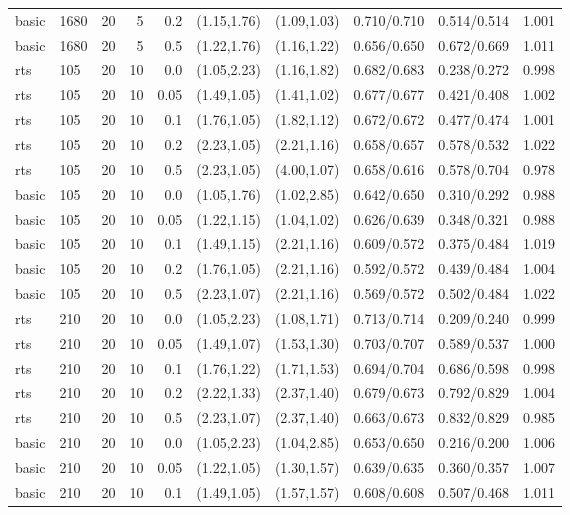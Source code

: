 \begin{tabular}{llrrrccccc}
basic & 1680 & 20 & 5 & 0.2 & (1.15,1.76) & (1.09,1.03) & 0.710/0.710 & 0.514/0.514 & 1.001 \\
basic & 1680 & 20 & 5 & 0.5 & (1.22,1.76) & (1.16,1.22) & 0.656/0.650 & 0.672/0.669 & 1.011 \\
rts & 105 & 20 & 10 & 0.0 & (1.05,2.23) & (1.16,1.82) & 0.682/0.683 & 0.238/0.272 & 0.998 \\
rts & 105 & 20 & 10 & 0.05 & (1.49,1.05) & (1.41,1.02) & 0.677/0.677 & 0.421/0.408 & 1.002 \\
rts & 105 & 20 & 10 & 0.1 & (1.76,1.05) & (1.82,1.12) & 0.672/0.672 & 0.477/0.474 & 1.001 \\
rts & 105 & 20 & 10 & 0.2 & (2.23,1.05) & (2.21,1.16) & 0.658/0.657 & 0.578/0.532 & 1.022 \\
rts & 105 & 20 & 10 & 0.5 & (2.23,1.05) & (4.00,1.07) & 0.658/0.616 & 0.578/0.704 & 0.978 \\
basic & 105 & 20 & 10 & 0.0 & (1.05,1.76) & (1.02,2.85) & 0.642/0.650 & 0.310/0.292 & 0.988 \\
basic & 105 & 20 & 10 & 0.05 & (1.22,1.15) & (1.04,1.02) & 0.626/0.639 & 0.348/0.321 & 0.988 \\
basic & 105 & 20 & 10 & 0.1 & (1.49,1.15) & (2.21,1.16) & 0.609/0.572 & 0.375/0.484 & 1.019 \\
basic & 105 & 20 & 10 & 0.2 & (1.76,1.05) & (2.21,1.16) & 0.592/0.572 & 0.439/0.484 & 1.004 \\
basic & 105 & 20 & 10 & 0.5 & (2.23,1.07) & (2.21,1.16) & 0.569/0.572 & 0.502/0.484 & 1.022 \\
rts & 210 & 20 & 10 & 0.0 & (1.05,2.23) & (1.08,1.71) & 0.713/0.714 & 0.209/0.240 & 0.999 \\
rts & 210 & 20 & 10 & 0.05 & (1.49,1.07) & (1.53,1.30) & 0.703/0.707 & 0.589/0.537 & 1.000 \\
rts & 210 & 20 & 10 & 0.1 & (1.76,1.22) & (1.71,1.53) & 0.694/0.704 & 0.686/0.598 & 0.998 \\
rts & 210 & 20 & 10 & 0.2 & (2.22,1.33) & (2.37,1.40) & 0.679/0.673 & 0.792/0.829 & 1.004 \\
rts & 210 & 20 & 10 & 0.5 & (2.23,1.07) & (2.37,1.40) & 0.663/0.673 & 0.832/0.829 & 0.985 \\
basic & 210 & 20 & 10 & 0.0 & (1.05,2.23) & (1.04,2.85) & 0.653/0.650 & 0.216/0.200 & 1.006 \\
basic & 210 & 20 & 10 & 0.05 & (1.22,1.05) & (1.30,1.57) & 0.639/0.635 & 0.360/0.357 & 1.007 \\
basic & 210 & 20 & 10 & 0.1 & (1.49,1.05) & (1.57,1.57) & 0.608/0.608 & 0.507/0.468 & 1.011 \\

\end{tabular}
